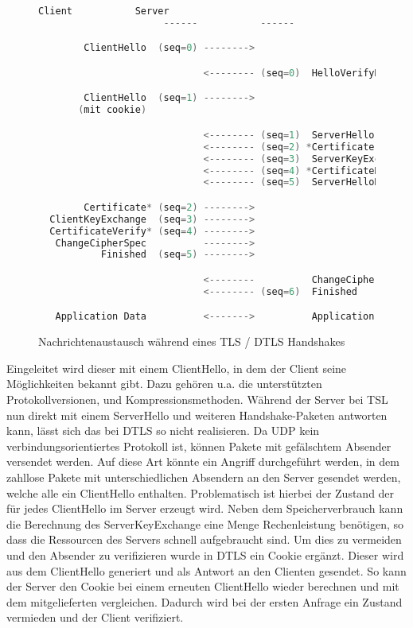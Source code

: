 \begin{figure}[ht]
  \centering
  \begin{lstlisting}[language=c]
                      Client           Server
                      ------           ------

        ClientHello  (seq=0) -------->

                             <-------- (seq=0)  HelloVerifyRequest    // Nur bei DTLS

        ClientHello  (seq=1) -------->                                // Nur bei DTLS
       (mit cookie)                                                   // Nur bei DTLS

                             <-------- (seq=1)  ServerHello
                             <-------- (seq=2) *Certificate
                             <-------- (seq=3)  ServerKeyExchange
                             <-------- (seq=4) *CertificateRequest
                             <-------- (seq=5)  ServerHelloDone

        Certificate* (seq=2) -------->
  ClientKeyExchange  (seq=3) -------->
  CertificateVerify* (seq=4) -------->
   ChangeCipherSpec          -------->
           Finished  (seq=5) -------->

                             <--------          ChangeCipherSpec
                             <-------- (seq=6)  Finished  

   Application Data          <------->          Application Data
  \end{lstlisting}
  \caption{Nachrichtenaustausch während eines TLS / DTLS Handshakes}
  \label{fig:handshake}
\end{figure}

Eingeleitet wird dieser mit einem ClientHello, in dem der Client seine Möglichkeiten bekannt gibt. Dazu gehören u.a. die unterstützten Protokollversionen, 
und Kompressionsmethoden. Während der Server bei TSL nun direkt mit einem ServerHello und weiteren Handshake-Paketen antworten kann, lässt sich das bei DTLS so nicht
realisieren. Da UDP kein verbindungsorientiertes Protokoll ist, können Pakete mit gefälschtem Absender versendet werden. Auf diese Art könnte ein  Angriff
durchgeführt werden, in dem zahllose Pakete mit unterschiedlichen Absendern an den Server gesendet werden, welche alle ein ClientHello enthalten. Problematisch ist
hierbei der Zustand der für jedes ClientHello im Server erzeugt wird. Neben dem Speicherverbrauch kann die Berechnung des ServerKeyExchange eine Menge Rechenleistung
benötigen, so dass die Ressourcen des Servers schnell aufgebraucht sind. Um dies zu vermeiden und den Absender zu verifizieren wurde in DTLS ein Cookie ergänzt.
Dieser wird aus dem ClientHello generiert und als Antwort an den Clienten gesendet. So kann der Server den Cookie bei einem erneuten ClientHello wieder berechnen
und mit dem mitgelieferten vergleichen. Dadurch wird bei der ersten Anfrage ein Zustand vermieden und der Client verifiziert.

